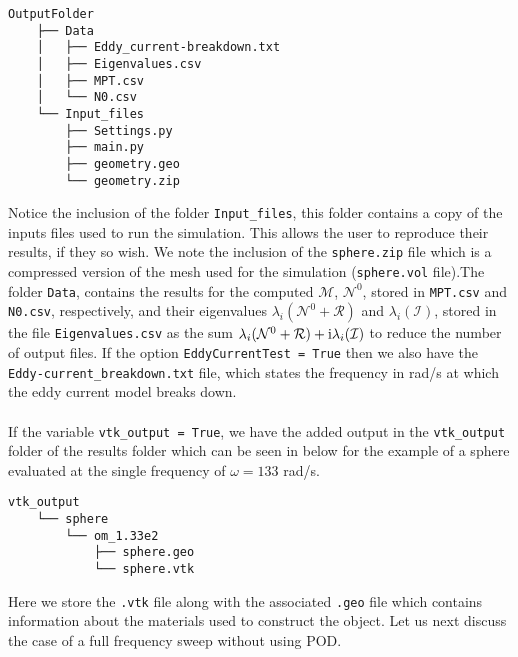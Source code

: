 \begin{Verbatim}
OutputFolder
    ├── Data
    │   ├── Eddy_current-breakdown.txt
    │   ├── Eigenvalues.csv
    │   ├── MPT.csv
    │   └── N0.csv
    └── Input_files
        ├── Settings.py
        ├── main.py
        ├── geometry.geo
        └── geometry.zip
\end{Verbatim}
%
\noindent
Notice the inclusion of the folder \texttt{Input\_files}, this folder contains a copy of the inputs files used to run the simulation. This allows the user to reproduce their results, if they so wish. We note the inclusion of the \texttt{sphere.zip} file which is a compressed version of the mesh used for the simulation (\texttt{sphere.vol} file).The folder \texttt{Data}, contains the results for the computed $\mathcal{M}$, $\mathcal{N}^0$, stored in \texttt{MPT.csv} and \texttt{N0.csv}, respectively,  and their eigenvalues $\lambda_i(\mathcal{N}^0+\mathcal{R})$ and $\lambda_i(\mathcal{I})$,  stored in the file \texttt{Eigenvalues.csv} as the sum $\lambda_i(\mathcal{N}^0+\mathcal{R})+\mathrm{i}\lambda_i(\mathcal{I})$ to reduce the number of output files. If the option \texttt{EddyCurrentTest = True} then we also have the \texttt{Eddy-current\_breakdown.txt} file, which states the frequency in rad/s at which the eddy current model breaks down.\\
\\
If the variable \texttt{vtk\_output = True}, we have the added output in the \texttt{vtk\_output} folder of the results folder which can be seen in below for the example of a sphere evaluated at the single frequency of $\omega = 133$ rad/s.

\begin{Verbatim}
vtk_output
    └── sphere
        └── om_1.33e2
            ├── sphere.geo
            └── sphere.vtk

\end{Verbatim}
%
\noindent
Here we store the \texttt{.vtk} file along with the associated \texttt{.geo} file which contains information about the materials used to construct the object. Let us next discuss the case of a full frequency sweep without using POD.\\

